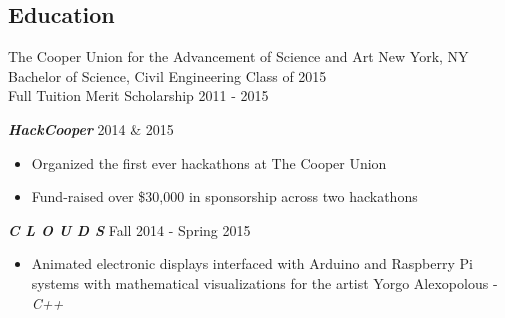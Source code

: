 \documentclass[overlapped]{res}
\begin{document}
\begin{resume}
    \section{Education}
    The Cooper Union for the Advancement of Science and Art \hfill New York, NY  \\
    Bachelor of Science, Civil Engineering              \hfill Class of 2015 \\
    Full Tuition Merit Scholarship                          \hfill 2011 - 2015


    {\bf {\em HackCooper\/}} \hfill 2014 \& 2015
    \begin{itemize} \itemsep-2pt
        \item
            Organized the first ever hackathons at The Cooper Union
        \item
            Fund-raised over \$30,000 in sponsorship across two hackathons
    \end{itemize}

    {\bf {\em C L O U D S\/}} \hfill Fall 2014 - Spring 2015
    \begin{itemize} \itemsep-2pt
        \item Animated electronic displays interfaced with Arduino and Raspberry Pi systems with mathematical visualizations for the artist Yorgo Alexopolous - {\em C++\/}
    \end{itemize}



\end{resume}
\end{document}
